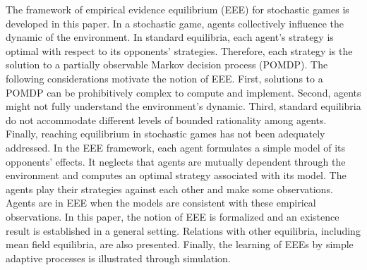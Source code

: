 The framework of empirical evidence equilibrium (EEE) for stochastic games is developed in this paper.
In a stochastic game, agents collectively influence the dynamic of the environment.
In standard equilibria, each agent's strategy is optimal with respect to its opponents' strategies.
Therefore, each strategy is the solution to a partially observable Markov decision process (POMDP).
The following considerations motivate the notion of EEE.
First, solutions to a POMDP can be prohibitively complex to compute and implement.
Second, agents might not fully understand the environment's dynamic.
Third, standard equilibria do not accommodate different levels of bounded rationality among agents.
Finally, reaching equilibrium in stochastic games has not been adequately addressed.
In the EEE framework, each agent formulates a simple model of its opponents' effects.
It neglects that agents are mutually dependent through the environment and computes an optimal strategy associated with its model.
The agents play their strategies against each other and make some observations.
Agents are in EEE when the models are consistent with these empirical observations.
In this paper, the notion of EEE is formalized and an existence result is established in a general setting.
Relations with other equilibria, including mean field equilibria, are also presented.
Finally, the learning of EEEs by simple adaptive processes is illustrated through simulation.

